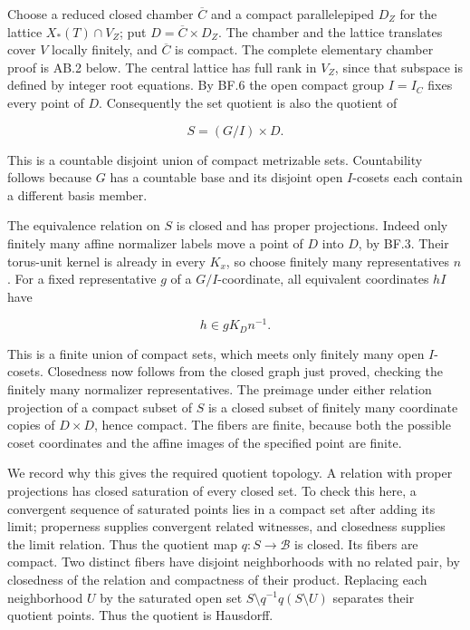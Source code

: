 \documentclass[
  11pt,
]{article}
\begin{document}
Choose a reduced closed chamber \(\overline C\) and a compact
parallelepiped \(D_Z\) for the lattice \(X_*(T)\cap V_Z\); put
\(D=\overline C\times D_Z\). The chamber and the lattice translates
cover \(V\) locally finitely, and \(\overline C\) is compact. The
complete elementary chamber proof is AB.2 below. The central lattice has
full rank in \(V_Z\), since that subspace is defined by integer root
equations. By BF.6 the open compact group \(I=I_C\) fixes every point of
\(D\). Consequently the set quotient is also the quotient of

\[
 S=(G/I)\times D.
 \tag{AB.4}
\]

This is a countable disjoint union of compact metrizable sets.
Countability follows because \(G\) has a countable base and its disjoint
open \(I\)-cosets each contain a different basis member.

The equivalence relation on \(S\) is closed and has proper projections.
Indeed only finitely many affine normalizer labels move a point of \(D\)
into \(D\), by BF.3. Their torus-unit kernel is already in every
\(K_x\), so choose finitely many representatives \(n\). For a fixed
representative \(g\) of a \(G/I\)-coordinate, all equivalent coordinates
\(hI\) have

\[
 h\in gK_Dn^{-1}.
\]

This is a finite union of compact sets, which meets only finitely many
open \(I\)-cosets. Closedness now follows from the closed graph just
proved, checking the finitely many normalizer representatives. The
preimage under either relation projection of a compact subset of \(S\)
is a closed subset of finitely many coordinate copies of \(D\times D\),
hence compact. The fibers are finite, because both the possible coset
coordinates and the affine images of the specified point are finite.

We record why this gives the required quotient topology. A relation with
proper projections has closed saturation of every closed set. To check
this here, a convergent sequence of saturated points lies in a compact
set after adding its limit; properness supplies convergent related
witnesses, and closedness supplies the limit relation. Thus the quotient
map \(q:S\to\mathcal B\) is closed. Its fibers are compact. Two distinct
fibers have disjoint neighborhoods with no related pair, by closedness
of the relation and compactness of their product. Replacing each
neighborhood \(U\) by the saturated open set
\(S\setminus q^{-1}q(S\setminus U)\) separates their quotient points.
Thus the quotient is Hausdorff.
\end{document}
